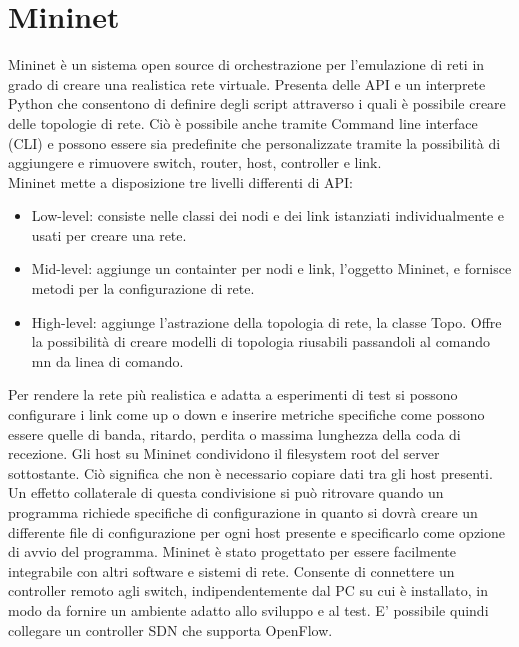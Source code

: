 \chapter{Mininet}
Mininet \cite{mininet} è un sistema open source di orchestrazione per l'emulazione di reti in grado di creare una realistica rete virtuale.
Presenta delle API e un interprete Python che consentono di definire degli script attraverso i quali è possibile creare delle topologie di rete.
Ciò è possibile anche tramite Command line interface (CLI)  e possono essere sia predefinite che personalizzate tramite la possibilità di 
aggiungere e rimuovere switch, router, host, controller e link.
\\Mininet mette a disposizione tre livelli differenti di API:
\begin{itemize}
\item Low-level: consiste nelle classi dei nodi e dei link istanziati individualmente e usati per creare una rete.
\item Mid-level: aggiunge un containter per nodi e link, l'oggetto Mininet, e fornisce metodi per la configurazione di rete.
\item High-level: aggiunge l'astrazione della topologia di rete, la classe Topo. Offre la possibilità di creare modelli di topologia riusabili passandoli al comando mn da linea di comando.
\end{itemize}
Per rendere la rete più realistica e adatta a esperimenti di test si possono configurare i link come up o down e inserire metriche specifiche 
come possono essere quelle di banda, ritardo, perdita o massima lunghezza della coda di recezione.
Gli host su Mininet condividono il filesystem root del server sottostante. 
Ciò significa che non è necessario copiare dati tra gli host presenti.
Un effetto collaterale di questa condivisione si può ritrovare quando un programma richiede specifiche di configurazione in quanto si dovrà creare un differente 
file di configurazione per ogni host presente e specificarlo come opzione di avvio del programma. 
Mininet è stato progettato per essere facilmente integrabile con altri software e sistemi di rete.
Consente di connettere un controller remoto agli switch, indipendentemente dal PC su cui è installato, in modo da fornire un ambiente adatto allo sviluppo e al test.
E' possibile quindi collegare un controller SDN che supporta OpenFlow.

